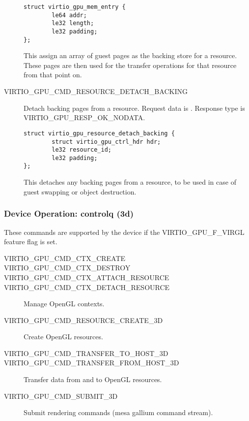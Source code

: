 \begin{description}
\begin{lstlisting}
struct virtio_gpu_mem_entry {
        le64 addr;
        le32 length;
        le32 padding;
};
\end{lstlisting}

This assign an array of guest pages as the backing store for a
resource. These pages are then used for the transfer operations for
that resource from that point on.

\item[VIRTIO_GPU_CMD_RESOURCE_DETACH_BACKING] Detach backing pages
  from a resource.  Request data is .  Response type is
  VIRTIO_GPU_RESP_OK_NODATA.

\begin{lstlisting}
struct virtio_gpu_resource_detach_backing {
        struct virtio_gpu_ctrl_hdr hdr;
        le32 resource_id;
        le32 padding;
};
\end{lstlisting}

This detaches any backing pages from a resource, to be used in case of
guest swapping or object destruction.

\end{description}

\subsubsection{Device Operation: controlq (3d)}\label{sec:Device Types / GPU Device / Device Operation / Device Operation: controlq (3d)}

These commands are supported by the device if the VIRTIO_GPU_F_VIRGL
feature flag is set.

\begin{description}

\item[VIRTIO_GPU_CMD_CTX_CREATE]
\item[VIRTIO_GPU_CMD_CTX_DESTROY]
\item[VIRTIO_GPU_CMD_CTX_ATTACH_RESOURCE]
\item[VIRTIO_GPU_CMD_CTX_DETACH_RESOURCE]
  Manage OpenGL contexts.

\item[VIRTIO_GPU_CMD_RESOURCE_CREATE_3D]
  Create OpenGL resources.

\item[VIRTIO_GPU_CMD_TRANSFER_TO_HOST_3D]
\item[VIRTIO_GPU_CMD_TRANSFER_FROM_HOST_3D]
  Transfer data from and to OpenGL resources.

\item[VIRTIO_GPU_CMD_SUBMIT_3D]
  Submit rendering commands (mesa gallium command stream).

\end{description}

